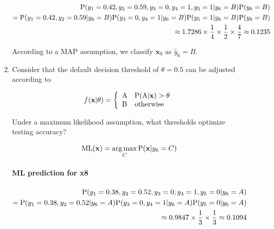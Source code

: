 \documentclass[12pt]{article}
\DeclareMathOperator*{\argmax}{arg\,max}
\begin{document}
\begin{enumerate}[leftmargin=\labelsep]
\begin{enumerate}
        \begin{equation}
        \begin{split}
            \textrm{P}(y_1 = 0.42, y_2 = 0.59, y_3 = 0, y_4 = 1, y_5 = 1|y_6 = B)\textrm{P}(y_6 = B)\\
            = \textrm{P}(y_1 = 0.42, y_2 = 0.59|y_6 = B)\textrm{P}(y_3 = 0, y_4 = 1|y_6 = B)\textrm{P}(y_5 = 1|y_6 = B)\textrm{P}(y_6 = B)\\
            \approx 1.7286 \times \frac{1}{4} \times \frac{1}{2} \times \frac{4}{7} \approx 0.1235
        \end{split}
        \end{equation}

        According to a MAP assumption, we classify $\mathbf{x}_9$ as $\hat{y}_6 = B$.

        \item  Consider that the default decision threshold of $\theta = 0.5$ can be adjusted according to
    
            \[ 
            f(\mathbf{x}|\theta)= \left\{
            \begin{array}{ll}
                  \textrm{A} & \textrm{P}(\textrm{A}|\mathbf{x}) > \theta \\
                  \textrm{B} & \textrm{otherwise}
            \end{array} 
            \right. 
            \]

            Under a maximum likelihood assumption, what thresholds optimize testing accuracy?

            \begin{equation}
                \textrm{ML}(\mathbf{x}) = \argmax_C \prob(\mathbf{x}|y_6 = C)
            \end{equation}

            \paragraph{ML prediction for x8}

            \begin{equation}
            \begin{split}
                \textrm{P}(y_1 = 0.38, y_2 = 0.52, y_3 = 0, y_4 = 1, y_5 = 0|y_6 = A) \\
                = \textrm{P}(y_1 = 0.38, y_2 = 0.52|y_6 = A)\textrm{P}(y_3 = 0, y_4 = 1|y_6 = A)\textrm{P}(y_5 = 0|y_6 = A) \\
                \approx 0.9847 \times \frac{1}{3} \times \frac{1}{3} \approx 0.1094
            \end{split}
            \end{equation}


\end{enumerate}
\end{enumerate}
\end{document}
